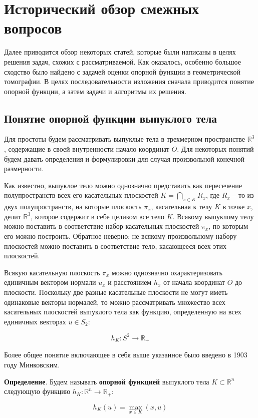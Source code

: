 \documentclass[a4paper,12pt, titlepage]{article}
\begin{document}
\section{Исторический обзор смежных вопросов}

Далее приводится обзор некоторых статей, которые были написаны в целях решения
задач, схожих с рассматриваемой. Как оказалось, особенно большое сходство было
найдено с задачей оценки опорной функции в геометрической томографии. В целях
последовательности изложения сначала приводится понятие опорной функции, а
затем задачи и алгоритмы их решения.

\subsection{Понятие опорной функции выпуклого тела}

Для простоты будем рассматривать выпуклые тела в трехмерном пространстве
$\mathbb{R}^{3}$, содержащие в своей внутренности начало координат $O$.
Для некоторых понятий будем давать определения и формулировки для случая
произвольной конечной размерности.

Как известно, выпуклое тело можно однозначно представить как пересечение 
полупространств всех его касательных плоскостей 
$K = \bigcap \limits_{x \in K} R_{x}$, где $R_{x}$ -- то из двух
полупространств, на которые плоскость $\pi_{x}$, касательная к телу $K$ в
точке $x$, делит $\mathbb{R}^{3}$, которое содержит в себе целиком все тело
$K$. Всякому выпуклому телу можно поставить в соответствие набор касательных 
плоскостей $\pi_{x}$, по которым его можно построить. Обратное неверно: не
всякому произвольному набору плоскостей можно поставить в соответствие тело,
касающееся всех этих плоскостей.

Всякую касательную плоскость $\pi_{x}$ можно однозначно охарактеризовать
единичным вектором нормали $u_{x}$ и расстоянием $h_{x}$ от начала координат 
$O$ до плоскости. Поскольку две разные касательные плоскости не могут иметь
одинаковые векторы нормалей, то можно рассматривать множество всех касательных
плоскостей выпуклого тела как функцию, определенную на всех единичных векторах
$u \in S_{2}$:

$$h_{K}: S^{2} \to \mathbb{R}_{+}$$

Более общее понятие включающее в себя выше указанное было введено в 1903 году
Минковским.

\begin{flushleft}
\textbf{Определение}. Будем называть \textbf{опорной функцией} выпуклого тела
$K \subset \mathbb{R}^{n}$ следующую функцию 
$h_{K}: \mathbb{R}^{n} \to \mathbb{R}_{+}$:

$$h_{K}(u) = \max \limits_{x \in K}(x, u)$$
\end{flushleft}
\end{document}
